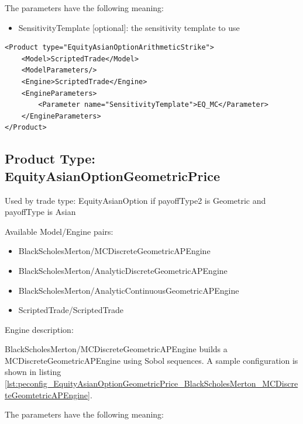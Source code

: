 The parameters have the following meaning:

\begin{itemize}
\item SensitivityTemplate [optional]: the sensitivity template to use
\end{itemize}

\begin{longlisting}
\begin{verbatim}
<Product type="EquityAsianOptionArithmeticStrike">
    <Model>ScriptedTrade</Model>
    <ModelParameters/>
    <Engine>ScriptedTrade</Engine>
    <EngineParameters>
        <Parameter name="SensitivityTemplate">EQ_MC</Parameter>
    </EngineParameters>
</Product>
\end{verbatim}
\caption{Configuration for Product EquityAsianOptionArithmeticStrike, Model ScriptedTrade, Engine ScriptedTrade}
\label{lst:peconfig_EquityAsianOptionArithmeticStrike_ScriptedTrade_ScriptedTrade}
\end{longlisting}

\subsection{Product Type: EquityAsianOptionGeometricPrice}

Used by trade type: EquityAsianOption if payoffType2 is Geometric and payoffType is Asian

Available Model/Engine pairs:

\begin{itemize}
  \item BlackScholesMerton/MCDiscreteGeometricAPEngine
  \item BlackScholesMerton/AnalyticDiscreteGeometricAPEngine
  \item BlackScholesMerton/AnalyticContinuousGeometricAPEngine
  \item ScriptedTrade/ScriptedTrade
\end{itemize}

Engine description:

BlackScholesMerton/MCDiscreteGeometricAPEngine builds a MCDiscreteGeometricAPEngine using Sobol sequences. A sample
configuration is shown in listing
\ref{lst:peconfig_EquityAsianOptionGeometricPrice_BlackScholesMerton_MCDiscreteGeomtetricAPEngine}.

The parameters have the following meaning:

